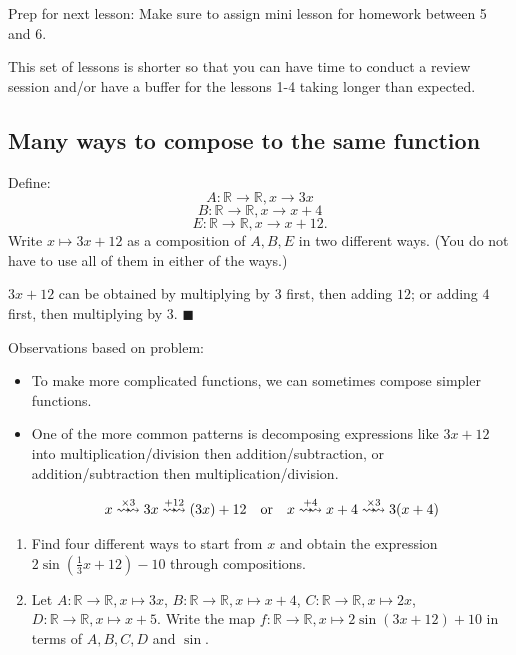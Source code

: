 \documentclass[11pt]{article}
\newenvironment{task}
	{\begin{mdframed}[linecolor=lightgray, linewidth=3pt]\raggedright}
	{\end{mdframed}}
\newcommand\tn{\textnormal}
\newcommand{\R}{\mathbb{R}}
\theoremstyle{definition}
\newenvironment{solution}{{\it Solution.} }{\hfill {\color{lightgray}$\blacksquare$}}
\begin{document}
Prep for next lesson:
Make sure to assign mini lesson for homework between 5 and 6. 

This set of lessons is shorter so that you can have time to conduct a review session and/or have a buffer for the lessons 1-4 taking longer than expected.

\newpage
\subsection{Many ways to compose to the same function}

\begin{task}
Define:
$$A:\R\to \R, x\to 3x$$
$$B:\R\to \R, x\to x+4$$
$$E:\R\to\R, x\to x+12.$$
Write $x\mapsto 3x+12$ as a composition of $A, B, E$ in two different ways. (You do not have to use all of them in either of the ways.)
\end{task} 

\begin{solution}
$3x+12$ can be obtained by multiplying by $3$ first, then adding $12$; or adding $4$ first, then multiplying by $3$. 
\end{solution}

Observations based on problem:

\begin{itemize}
\item To make more complicated functions, we can sometimes compose simpler functions.
\item One of the more common patterns is decomposing expressions like $3x+12$ into multiplication/division then addition/subtraction, or addition/subtraction then multiplication/division.


	$$x \stackrel{\times 3}{\rightsquigarrow\!\!\rightsquigarrow} 3x \stackrel{+12}{\rightsquigarrow\!\!\rightsquigarrow}  (3x)+12 \tn{\quad or\quad} x \stackrel{+4}{\rightsquigarrow\!\!\rightsquigarrow}  x+4 \stackrel{\times 3}{\rightsquigarrow\!\!\rightsquigarrow} 3(x+4)$$  
\end{itemize}

\vspace*{-3pt}
\begin{task}

\begin{enumerate}
\item Find four different ways to start from $x$ and obtain the expression $2\sin(\frac{1}{3}x+12)-10$ through compositions.
\item Let
	$A:\R\to\R, x\mapsto 3x$, \quad $B:\R\to \R, x\mapsto x+4$, \quad $C:\R\to \R,x\mapsto 2x$, \quad$D:\R\to \R,x\mapsto x+5$. Write the map $f:\R\to\R, x\mapsto 2\sin(3x+12)+10$ in terms of $A, B, C, D$ and $\sin$. 
\end{enumerate}
\end{task}
\end{document}
